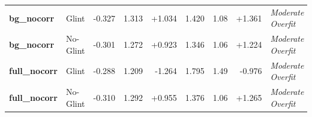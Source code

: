 \begin{table}[htbp]
{\begin{tabular}{ll r r r r r r l}
\textbf{bg\_nocorr} & Glint & -0.327 & 1.313 & +1.034 & 1.420 & 1.08 & +1.361 & \textit{Moderate Overfit} \\
\textbf{bg\_nocorr} & No-Glint & -0.301 & 1.272 & +0.923 & 1.346 & 1.06 & +1.224 & \textit{Moderate Overfit} \\
\textbf{full\_nocorr} & Glint & -0.288 & 1.209 & -1.264 & 1.795 & 1.49 & -0.976 & \textit{Moderate Overfit} \\
\textbf{full\_nocorr} & No-Glint & -0.310 & 1.292 & +0.955 & 1.376 & 1.06 & +1.265 & \textit{Moderate Overfit} \\
\bottomrule
\end{tabular}%
}
\end{table}